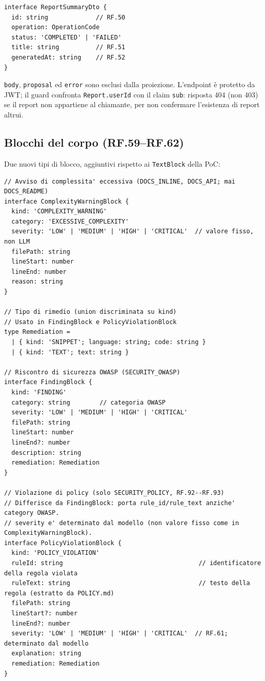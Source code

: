 \documentclass[11pt,a4paper]{article}
\begin{document}
\begin{lstlisting}[caption={\texttt{ReportSummaryDto}: proiezione restituita da \texttt{GET /reports}.}]
interface ReportSummaryDto {
  id: string             // RF.50
  operation: OperationCode
  status: 'COMPLETED' | 'FAILED'
  title: string          // RF.51
  generatedAt: string    // RF.52
}
\end{lstlisting}

\texttt{body}, \texttt{proposal} ed \texttt{error} sono esclusi dalla proiezione. L'endpoint è protetto da JWT; il guard confronta \texttt{Report.userId} con il claim \texttt{sub}: risposta 404 (non 403) se il report non appartiene al chiamante, per non confermare l'esistenza di report altrui.

\subsection{Blocchi del corpo (RF.59--RF.62)}

Due nuovi tipi di blocco, aggiuntivi rispetto ai \texttt{TextBlock} della PoC:

\begin{lstlisting}[caption={Nuovi tipi di blocco per l'MVP.}]
// Avviso di complessita' eccessiva (DOCS_INLINE, DOCS_API; mai DOCS_README)
interface ComplexityWarningBlock {
  kind: 'COMPLEXITY_WARNING'
  category: 'EXCESSIVE_COMPLEXITY'
  severity: 'LOW' | 'MEDIUM' | 'HIGH' | 'CRITICAL'  // valore fisso, non LLM
  filePath: string
  lineStart: number
  lineEnd: number
  reason: string
}

// Tipo di rimedio (union discriminata su kind)
// Usato in FindingBlock e PolicyViolationBlock
type Remediation =
  | { kind: 'SNIPPET'; language: string; code: string }
  | { kind: 'TEXT'; text: string }

// Riscontro di sicurezza OWASP (SECURITY_OWASP)
interface FindingBlock {
  kind: 'FINDING'
  category: string        // categoria OWASP
  severity: 'LOW' | 'MEDIUM' | 'HIGH' | 'CRITICAL'
  filePath: string
  lineStart: number
  lineEnd?: number
  description: string
  remediation: Remediation
}

// Violazione di policy (solo SECURITY_POLICY, RF.92--RF.93)
// Differisce da FindingBlock: porta rule_id/rule_text anziche' category OWASP.
// severity e' determinato dal modello (non valore fisso come in ComplexityWarningBlock).
interface PolicyViolationBlock {
  kind: 'POLICY_VIOLATION'
  ruleId: string                                     // identificatore della regola violata
  ruleText: string                                   // testo della regola (estratto da POLICY.md)
  filePath: string
  lineStart?: number
  lineEnd?: number
  severity: 'LOW' | 'MEDIUM' | 'HIGH' | 'CRITICAL'  // RF.61; determinato dal modello
  explanation: string
  remediation: Remediation
}
\end{lstlisting}
\end{document}
